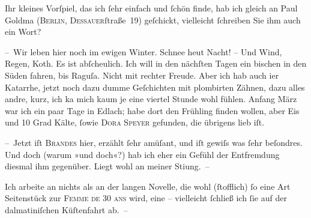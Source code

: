 \pstart
           Ihr kleines Vorſpiel, das ich
               ſehr einfach und ſchön finde, hab ich gleich an Paul Goldma{\geminationn} (\textsc{Berlin}, \textsc{Dessauer}ſtraße 19) geſchickt, vielleicht ſchreiben
               Sie ihm auch ein Wort? \pend
           
\pstart
           – Wir leben hier noch im ewigen {\pb}Winter. Schnee heut
               Nacht! – Und Wind, Regen, Koth. Es ist abſcheulich. Ich will in den nächſten Tagen
               ein bischen in den Süden fahren, bis Raguſa.
               Nicht mit rechter Freude. Aber ich hab auch i{\geminationm}er
               Katarrhe, jetzt noch dazu dumme Geſchichten mit plombirten Zähnen, dazu alles andre,
               kurz, ich ka{\geminationn}{ }{\pb}mich kaum je eine viertel Stunde wohl fühlen.
                  Anfang März war ich ein paar Tage in Edlach; habe dort den Frühling finden wollen, aber Eis und 10 Grad Kälte,
               ſowie \textsc{Dora Speyer} gefunden, die übrigens lieb iſt.\pend
           
\pstart
           – Jetzt iſt \textsc{Brandes} hier, erzählt ſehr amüſant, und iſt gewiſs was ſehr beſondres. Und {\pb}doch (warum »und doch«?) hab ich eher ein Gefühl der
               Entfremdung diesmal ihm gegenüber. Liegt wohl an meiner Sti{\geminationm}ung. –\pend
           
\pstart
           Ich arbeite an nichts als an der langen Novelle, die wohl (ſtofflich) ſo eine Art Seitenstück zur
                  \textsc{Femme de 30 ans} wird, eine \label{K_L01024-2v}\label{K_L01024-2}
               – viel{\pb}leicht ſchließ ich ſie auf der dalmatiniſchen Küſtenfahrt ab. –\pend
           
